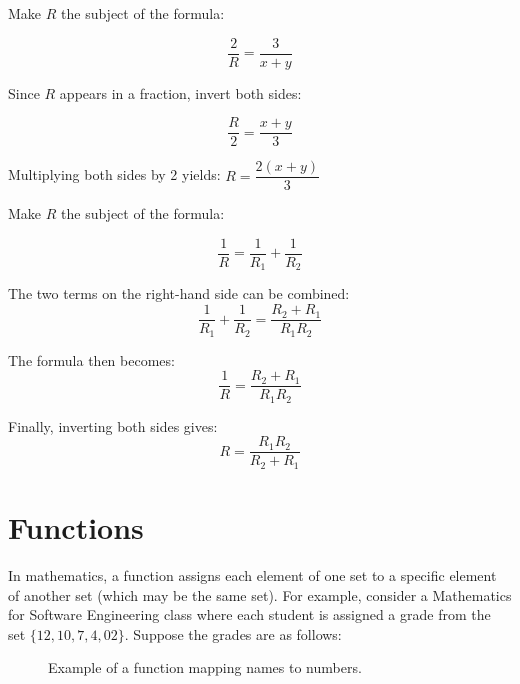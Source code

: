 \begin{example} Make \(R\) the subject of the formula:

\[
\frac{2}{R} = \frac{3}{x + y}
\]

\begin{solution} Since \(R\) appears in a fraction, invert both sides:

\[
\frac{R}{2} = \frac{x + y}{3}
\]

Multiplying both sides by 2 yields: $R = \dfrac{2(x + y)}{3}$    
\end{solution}
    
\end{example} 

\begin{example} Make \(R\) the subject of the formula:

\[
\frac{1}{R} = \frac{1}{R_1} + \frac{1}{R_2}
\]
\begin{solution}
The two terms on the right-hand side can be combined:
\[
\frac{1}{R_1} + \frac{1}{R_2} = \frac{R_2 + R_1}{R_1R_2}
\]

The formula then becomes:
\[
\frac{1}{R} = \frac{R_2 + R_1}{R_1R_2}
\]

Finally, inverting both sides gives:
\[
R = \frac{R_1R_2}{R_2 + R_1}
\]

\end{solution}
\end{example}

\section{Functions}
In mathematics, a function assigns each element of one set to a specific element of another set (which may be the same set). For example, consider a Mathematics for Software Engineering class where each student is assigned a grade from the set \(\{12, 10, 7, 4, 02\}\). Suppose the grades are as follows:

\begin{figure}[htbp]
    \centering
    \caption{Example of a function mapping names to numbers.}
    \label{fig:names_to_numbers}
\end{figure}


